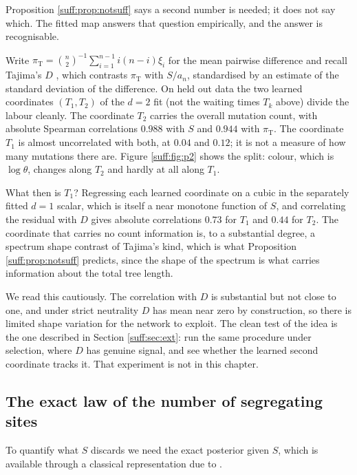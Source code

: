 Proposition \ref{suff:prop:notsuff} says a second number is needed; it does not say which. The
fitted map answers that question empirically, and the answer is recognisable.

Write $\pi_{\mathrm{T}}=\binom{n}{2}^{-1}\sum_{i=1}^{n-1}i(n-i)\xi_i$ for the mean pairwise
difference and recall Tajima's $D$ \citep{suff:tajima1989}, which contrasts $\pi_{\mathrm{T}}$
with $S/a_n$, standardised by an estimate of the standard deviation of the difference. On held
out data the two learned coordinates $(T_1,T_2)$ of the $d=2$ fit (not the waiting times $T_k$ above) divide the labour cleanly.
The coordinate $T_2$ carries the overall mutation count, with absolute Spearman correlations
$0.988$ with $S$ and $0.944$ with $\pi_{\mathrm{T}}$. The coordinate $T_1$ is almost
uncorrelated with both, at $0.04$ and $0.12$; it is not a measure of how many mutations there
are. Figure \ref{suff:fig:p2} shows the split: colour, which is $\log\theta$, changes along
$T_2$ and hardly at all along $T_1$.

What then is $T_1$? Regressing each learned coordinate on a cubic in the separately fitted
$d=1$ scalar, which is itself a near monotone function of $S$, and correlating the residual
with $D$ gives absolute correlations $0.73$ for $T_1$ and $0.44$ for $T_2$. The coordinate that
carries no count information is, to a substantial degree, a spectrum shape contrast of
Tajima's kind, which is what Proposition \ref{suff:prop:notsuff} predicts, since the shape of
the spectrum is what carries information about the total tree length.

We read this cautiously. The correlation with $D$ is substantial but not close to one, and
under strict neutrality $D$ has mean near zero by construction, so there is limited shape
variation for the network to exploit. The clean test of the idea is the one described in
Section \ref{suff:sec:ext}: run the same procedure under selection, where $D$ has genuine
signal, and see whether the learned second coordinate tracks it. That experiment is not in
this chapter.

\subsection{The exact law of the number of segregating sites}
\label{suff:sec:Slaw}

To quantify what $S$ discards we need the exact posterior given $S$, which is available
through a classical representation due to \citet{suff:watterson1975}.

